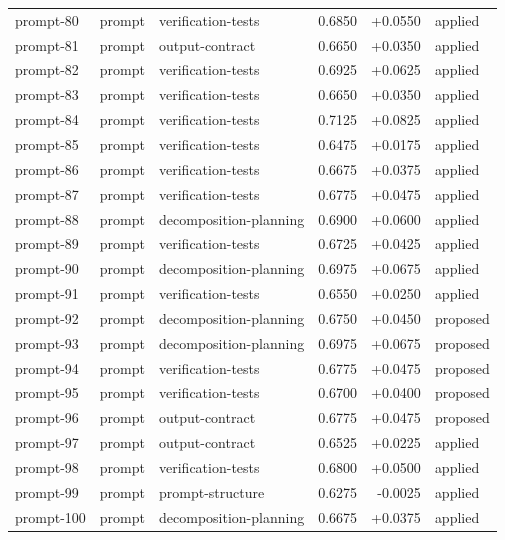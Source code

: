 \begin{center}
\begin{longtable}{llp{5.2cm}rrl}
prompt-80 & prompt & verification-tests & 0.6850 & +0.0550 & applied \\
prompt-81 & prompt & output-contract & 0.6650 & +0.0350 & applied \\
prompt-82 & prompt & verification-tests & 0.6925 & +0.0625 & applied \\
prompt-83 & prompt & verification-tests & 0.6650 & +0.0350 & applied \\
prompt-84 & prompt & verification-tests & 0.7125 & +0.0825 & applied \\
prompt-85 & prompt & verification-tests & 0.6475 & +0.0175 & applied \\
prompt-86 & prompt & verification-tests & 0.6675 & +0.0375 & applied \\
prompt-87 & prompt & verification-tests & 0.6775 & +0.0475 & applied \\
prompt-88 & prompt & decomposition-planning & 0.6900 & +0.0600 & applied \\
prompt-89 & prompt & verification-tests & 0.6725 & +0.0425 & applied \\
prompt-90 & prompt & decomposition-planning & 0.6975 & +0.0675 & applied \\
prompt-91 & prompt & verification-tests & 0.6550 & +0.0250 & applied \\
prompt-92 & prompt & decomposition-planning & 0.6750 & +0.0450 & proposed \\
prompt-93 & prompt & decomposition-planning & 0.6975 & +0.0675 & proposed \\
prompt-94 & prompt & verification-tests & 0.6775 & +0.0475 & proposed \\
prompt-95 & prompt & verification-tests & 0.6700 & +0.0400 & proposed \\
prompt-96 & prompt & output-contract & 0.6775 & +0.0475 & proposed \\
prompt-97 & prompt & output-contract & 0.6525 & +0.0225 & applied \\
prompt-98 & prompt & verification-tests & 0.6800 & +0.0500 & applied \\
prompt-99 & prompt & prompt-structure & 0.6275 & -0.0025 & applied \\
prompt-100 & prompt & decomposition-planning & 0.6675 & +0.0375 & applied \\
\bottomrule\end{longtable}\end{center}
\clearpage
